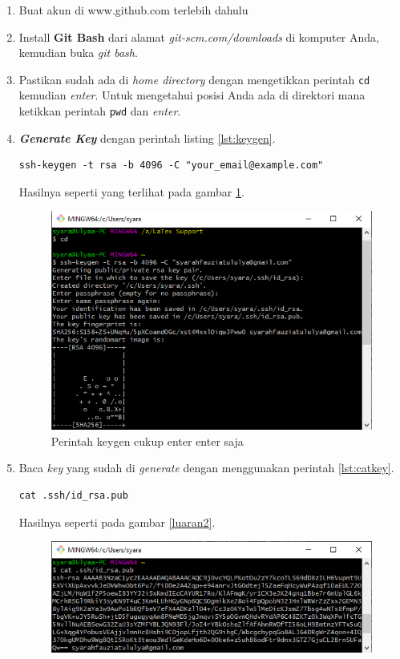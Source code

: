 \begin{enumerate}
\item Buat akun di www.github.com terlebih dahulu
\item Install \textbf{Git Bash} dari alamat \textit{git-scm.com/downloads} di komputer Anda, kemudian buka \textit{git bash}.
\item Pastikan sudah ada di \textit{home directory} dengan mengetikkan perintah \verb|cd| kemudian \textit{enter}. Untuk mengetahui posisi Anda ada di direktori mana ketikkan perintah \verb|pwd| dan \textit{enter}.
\item \textbf{\textit{Generate Key}} dengan perintah listing \ref{lst:keygen}.

\begin{lstlisting}[caption=Perintah Membuat Key,label={lst:keygen}]
ssh-keygen -t rsa -b 4096 -C "your_email@example.com"
\end{lstlisting}
Hasilnya seperti yang terlihat pada gambar \ref{luaran1}.
\begin{figure}[!htbp]
\centerline{\includegraphics[width=.75\textwidth]{Figures/langkah1.PNG}}
\caption{Perintah keygen cukup enter enter saja}
\label{luaran1}
\end{figure}
\item Baca \textit{key} yang sudah di \textit{generate} dengan menggunakan perintah \ref{lst:catkey}.
\begin{lstlisting}[caption=Perintah Membaca Public Key,breaklines,label={lst:catkey}]
cat .ssh/id_rsa.pub
\end{lstlisting}
Hasilnya seperti pada gambar \ref{luaran2}.
\begin{figure}[!htbp]
\centerline{\includegraphics[width=.75\textwidth]{Figures/langkah2.PNG}}

\end{figure}
\end{enumerate}
